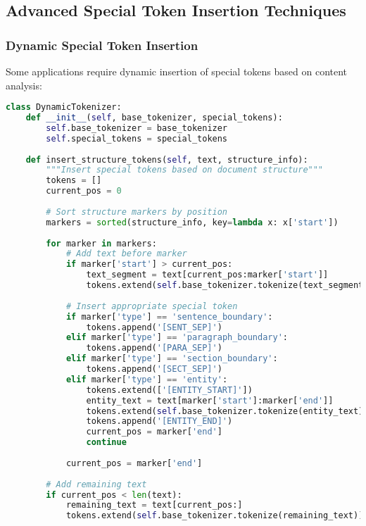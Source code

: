 \subsection{Advanced Special Token Insertion Techniques}

\subsubsection{Dynamic Special Token Insertion}

Some applications require dynamic insertion of special tokens based on content analysis:

\begin{lstlisting}[language=Python, caption=Dynamic special token insertion]
class DynamicTokenizer:
    def __init__(self, base_tokenizer, special_tokens):
        self.base_tokenizer = base_tokenizer
        self.special_tokens = special_tokens
        
    def insert_structure_tokens(self, text, structure_info):
        """Insert special tokens based on document structure"""
        tokens = []
        current_pos = 0
        
        # Sort structure markers by position
        markers = sorted(structure_info, key=lambda x: x['start'])
        
        for marker in markers:
            # Add text before marker
            if marker['start'] > current_pos:
                text_segment = text[current_pos:marker['start']]
                tokens.extend(self.base_tokenizer.tokenize(text_segment))
            
            # Insert appropriate special token
            if marker['type'] == 'sentence_boundary':
                tokens.append('[SENT_SEP]')
            elif marker['type'] == 'paragraph_boundary':
                tokens.append('[PARA_SEP]')
            elif marker['type'] == 'section_boundary':
                tokens.append('[SECT_SEP]')
            elif marker['type'] == 'entity':
                tokens.extend(['[ENTITY_START]'])
                entity_text = text[marker['start']:marker['end']]
                tokens.extend(self.base_tokenizer.tokenize(entity_text))
                tokens.append('[ENTITY_END]')
                current_pos = marker['end']
                continue
                
            current_pos = marker['end']
        
        # Add remaining text
        if current_pos < len(text):
            remaining_text = text[current_pos:]
            tokens.extend(self.base_tokenizer.tokenize(remaining_text))
            

\end{lstlisting}
